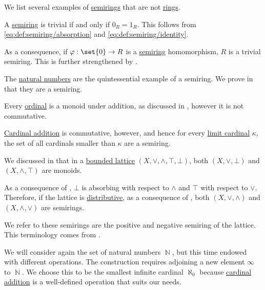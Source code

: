 \begin{example}\label{ex:def:semiring}
  We list several examples of \hyperref[def:semiring]{semirings} that are not \hyperref[def:ring]{rings}.

  \begin{thmenum}
     A \hyperref[def:semiring/homomorphism]{semiring} is trivial if and only if \( 0_R = 1_R \). This follows from \eqref{eq:def:semiring/absorption} and \eqref{eq:def:semiring/identity}.

    As a consequence, if \( \varphi: \set{ 0 } \to R \) is a \hyperref[def:semiring/homomorphism]{semiring} homomorphism, \( R \) is a trivial semiring. This is further strengthened by .

     The \hyperref[def:set_of_natural_numbers]{natural numbers} are the quintessential example of a semiring. We prove in  that they are a semiring.

     Every \hyperref[def:ordinal]{ordinal} is a monoid under addition, as discussed in , however it is not commutative.

    \hyperref[def:cardinal_arithmetic/addition]{Cardinal addition} is commutative, however, and hence for every \hyperref[def:successor_and_limit_cardinal/weak_limit]{limit cardinal} \( \kappa \), the set of all cardinals smaller than \( \kappa \) are a semiring.

     We discussed in  that in a \hyperref[def:semilattice/bounded]{bounded lattice} \( (X, \vee, \wedge, \top, \bot) \), both \( (X, \vee, \bot) \) and \( (X, \wedge, \top) \) are monoids.

    As a consequence of , \( \bot \) is absorbing with respect to \( \wedge \) and \( \top \) with respect to \( \vee \). Therefore, if the lattice is \hyperref[def:semilattice/distributive_lattice]{distributive}, as a consequence of , both \( (X, \vee, \wedge) \) and \( (X, \wedge, \vee) \) are semirings.

    We refer to these semirings are the positive and negative semiring of the lattice. This terminology comes from .

     We will consider again the set of natural numbers \( \BbbN \), but this time endowed with different operations. The construction requires adjoining a new element \( \infty \) to \( \BbbN \). We choose this to be the smallest infinite cardinal \hyperref[def:aleph_hierarchy]{\( \aleph_0 \)} because \hyperref[def:cardinal_arithmetic/addition]{cardinal addition} is a well-defined operation that suits our needs.


\end{thmenum}
\end{example}
